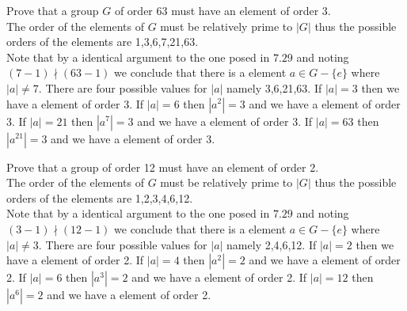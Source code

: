 \documentclass[12pt]{article}
\makeatletter
\theoremstyle{homework}
\newenvironment{exercise}[1]
{\def\@currentlabel{#1}\exercisecore}
{\endexercisecore}
\makeatother
\begin{document}
\begin{exercise}{7.40}
Prove that a group $G$ of order 63 must have an element of order 3.\\
The order of the elements of $G$ must be relatively prime to $|G|$ thus the possible orders of the elements are 1,3,6,7,21,63.\\
Note that by a identical argument to the one posed in $7.29$ and noting $(7-1)\nmid (63-1)$ we conclude that there is a element $a\in G-\{e\}$ where $|a|\neq 7$.  There are four possible values for $|a|$ namely 3,6,21,63.  If $|a|=3$ then we have a element of order 3.  If $|a|=6$ then $|a^2|=3$ and we have a element of order 3.  If $|a|=21$ then $|a^7|=3$ and we have a element of order 3.  If $|a|=63$ then $|a^{21}|=3$ and we have a element of order 3.
\end{exercise}

\begin{exercise}{7.46}
Prove that a group of order 12 must have an element of order 2.\\
The order of the elements of $G$ must be relatively prime to $|G|$ thus the possible orders of the elements are 1,2,3,4,6,12.\\
Note that by a identical argument to the one posed in $7.29$ and noting $(3-1)\nmid (12-1)$ we conclude that there is a element $a\in G-\{e\}$ where $|a|\neq 3$.  There are four possible values for $|a|$ namely 2,4,6,12.  If $|a|=2$ then we have a element of order 2.  If $|a|=4$ then $|a^2|=2$ and we have a element of order 2.  If $|a|=6$ then $|a^3|=2$ and we have a element of order 2.  If $|a|=12$ then $|a^6|=2$ and we have a element of order 2.
\end{exercise}
\end{document}
